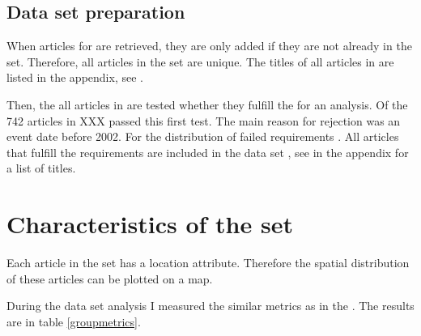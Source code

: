 \subsection{Data set preparation}

When articles for  are retrieved, they are only added if they are not already in the set. 
Therefore, all articles in the set are unique.
The titles of all articles in  are listed in the appendix, see .

Then, the all articles in  are tested whether they fulfill the  for an analysis.
Of the 742 articles in  XXX passed this first test.
The main reason for rejection was an event date before 2002. 
For the distribution of failed requirements .
All articles that fulfill the requirements are included in the data set , see  in the appendix for a list of titles.



%

\section{Characteristics of the set}

Each article in the set has a location attribute. 
Therefore the spatial distribution of these articles can be plotted on a map.



During the data set analysis I measured the similar metrics as in the .
The results are in table \ref{groupmetrics}.

